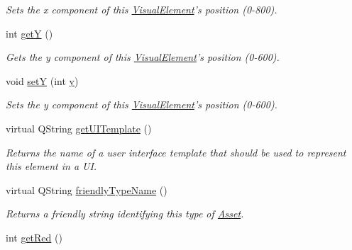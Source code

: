 \begin{DoxyCompactItemize}
\begin{DoxyCompactList}\small\item\em Sets the x component of this \hyperlink{struct_picto_1_1_visual_element}{Visual\-Element}'s position (0-\/800). \end{DoxyCompactList}\item 
\hypertarget{struct_picto_1_1_visual_element_a0636a7d215d0362c1a8eaddabb72edd9}{int \hyperlink{struct_picto_1_1_visual_element_a0636a7d215d0362c1a8eaddabb72edd9}{get\-Y} ()}\label{struct_picto_1_1_visual_element_a0636a7d215d0362c1a8eaddabb72edd9}

\begin{DoxyCompactList}\small\item\em Gets the y component of this \hyperlink{struct_picto_1_1_visual_element}{Visual\-Element}'s position (0-\/600). \end{DoxyCompactList}\item 
\hypertarget{struct_picto_1_1_visual_element_ae3b17b1ae9ac929957c3b55d430c9bac}{void \hyperlink{struct_picto_1_1_visual_element_ae3b17b1ae9ac929957c3b55d430c9bac}{set\-Y} (int \hyperlink{struct_picto_1_1_visual_element_a9a4db3430219e1f78208eda1a89e9f38}{y})}\label{struct_picto_1_1_visual_element_ae3b17b1ae9ac929957c3b55d430c9bac}

\begin{DoxyCompactList}\small\item\em Sets the y component of this \hyperlink{struct_picto_1_1_visual_element}{Visual\-Element}'s position (0-\/600). \end{DoxyCompactList}\item 
\hypertarget{struct_picto_1_1_visual_element_a2f50a52903c98dddde5ffd0c59d720ce}{virtual Q\-String \hyperlink{struct_picto_1_1_visual_element_a2f50a52903c98dddde5ffd0c59d720ce}{get\-U\-I\-Template} ()}\label{struct_picto_1_1_visual_element_a2f50a52903c98dddde5ffd0c59d720ce}

\begin{DoxyCompactList}\small\item\em Returns the name of a user interface template that should be used to represent this element in a U\-I. \end{DoxyCompactList}\item 
virtual Q\-String \hyperlink{struct_picto_1_1_visual_element_a78f92381924153f2c5f4b679812310eb}{friendly\-Type\-Name} ()
\begin{DoxyCompactList}\small\item\em Returns a friendly string identifying this type of \hyperlink{class_picto_1_1_asset}{Asset}. \end{DoxyCompactList}\item 
\hypertarget{struct_picto_1_1_visual_element_adfd608199ac2699b8d0ee49d5d62c4d1}{int \hyperlink{struct_picto_1_1_visual_element_adfd608199ac2699b8d0ee49d5d62c4d1}{get\-Red} ()}\label{struct_picto_1_1_visual_element_adfd608199ac2699b8d0ee49d5d62c4d1}


\end{DoxyCompactItemize}
